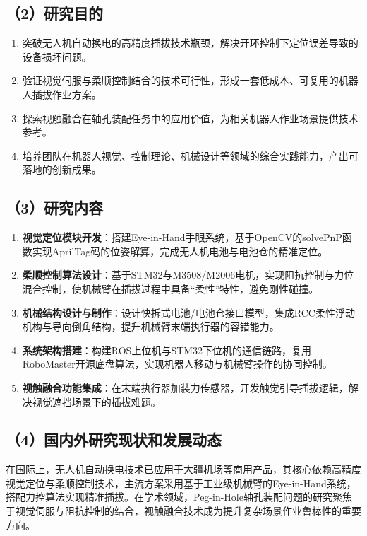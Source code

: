 \documentclass[a4paper,12pt]{ctexart}
\begin{document}
\subsection*{（2）研究目的}
\begin{enumerate}[label=\arabic*.]
    \item 突破无人机自动换电的高精度插拔技术瓶颈，解决开环控制下定位误差导致的设备损坏问题。
    \item 验证视觉伺服与柔顺控制结合的技术可行性，形成一套低成本、可复用的机器人插拔作业方案。
    \item 探索视触融合在轴孔装配任务中的应用价值，为相关机器人作业场景提供技术参考。
    \item 培养团队在机器人视觉、控制理论、机械设计等领域的综合实践能力，产出可落地的创新成果。
\end{enumerate}

\subsection*{（3）研究内容}
\begin{enumerate}[label=\arabic*.]
    \item \textbf{视觉定位模块开发}：搭建Eye-in-Hand手眼系统，基于OpenCV的solvePnP函数实现AprilTag码的位姿解算，完成无人机电池与电池仓的精准定位。
    \item \textbf{柔顺控制算法设计}：基于STM32与M3508/M2006电机，实现阻抗控制与力位混合控制，使机械臂在插拔过程中具备“柔性”特性，避免刚性碰撞。
    \item \textbf{机械结构设计与制作}：设计快拆式电池/电池仓接口模型，集成RCC柔性浮动机构与导向倒角结构，提升机械臂末端执行器的容错能力。
    \item \textbf{系统架构搭建}：构建ROS上位机与STM32下位机的通信链路，复用RoboMaster开源底盘算法，实现机器人移动与机械臂操作的协同控制。
    \item \textbf{视触融合功能集成}：在末端执行器加装力传感器，开发触觉引导插拔逻辑，解决视觉遮挡场景下的插拔难题。
\end{enumerate}

\subsection*{（4）国内外研究现状和发展动态}
在国际上，无人机自动换电技术已应用于大疆机场等商用产品，其核心依赖高精度视觉定位与柔顺控制技术，主流方案采用基于工业级机械臂的Eye-in-Hand系统，搭配力控算法实现精准插拔。在学术领域，Peg-in-Hole轴孔装配问题的研究聚焦于视觉伺服与阻抗控制的结合，视触融合技术成为提升复杂场景作业鲁棒性的重要方向。
\end{document}

